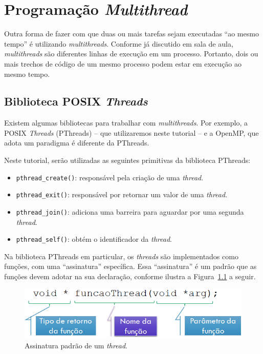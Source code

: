 \chapter{Programação \textit{Multithread}}
Outra forma de fazer com que duas ou mais tarefas sejam executadas \enquote{ao mesmo tempo} é utilizando \textit{multithreads}. Conforme já discutido em sala de aula, \textit{multithreads} são diferentes linhas de execução em um processo. Portanto, dois ou mais trechos de código de um mesmo processo podem estar em execução ao mesmo tempo.


\section{Biblioteca POSIX \textit{Threads}}
Existem algumas bibliotecas para trabalhar com \textit{multithreads}. Por exemplo, a POSIX \textit{Threads} (PThreads) -- que utilizaremos neste tutorial -- e a OpenMP, que adota um paradigma é diferente da PThreads.

Neste tutorial, serão utilizadas as seguintes primitivas  da biblioteca PThreads:

\begin{itemize}
\setlength{\itemsep}{1pt}\setlength{\parskip}{0pt}  \setlength{\parsep}{0pt}
\item \texttt{pthread\_create()}: responsável pela criação de uma \textit{thread}.
\item \texttt{pthread\_exit()}: responsável por retornar um valor de uma \textit{thread}.
\item \texttt{pthread\_join()}: adiciona uma barreira para aguardar por uma segunda \textit{thread}.
\item \texttt{pthread\_self()}: obtém o identificador da \textit{thread}.
\end{itemize}

Na biblioteca PThreads em particular, os \textit{threads} são implementados como funções, com uma \enquote{assinatura} específica. Essa \enquote{assinatura} é um padrão que as funções devem adotar na sua declaração, conforme ilustra a Figura~\ref{fig:assinaturaThread} a seguir. 

\begin{figure}[!htb]
    \centering
    \includegraphics[width=.8\textwidth]{AssinaturaThread.png}
    \caption{Assinatura padrão de um \textit{thread}.}
    \label{fig:assinaturaThread}
\end{figure}

